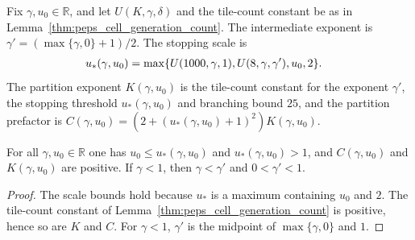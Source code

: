 \begin{definition}
    \label{def:peps_cell_partition_constants}
    \leanok
    Fix $\gamma,u_0\in\mathbb R$, and let $U(K,\gamma,\delta)$ and the
    tile-count constant be as in Lemma~\ref{thm:peps_cell_generation_count}.
    The intermediate exponent is $\gamma'=(\max\{\gamma,0\}+1)/2$. The stopping
    scale is
    \begin{align}
        u_*(\gamma,u_0) & =\max\{U(1000,\gamma,1),U(8,\gamma,\gamma'),u_0,2\}.
        \notag
    \end{align}
    The partition exponent $K(\gamma,u_0)$ is the tile-count constant for the
    exponent $\gamma'$, the stopping threshold $u_*(\gamma,u_0)$ and branching
    bound $25$, and the partition prefactor is
    $C(\gamma,u_0)=(2+(u_*(\gamma,u_0)+1)^2)K(\gamma,u_0)$.
\end{definition}

\begin{lemma}
    \label{thm:peps_cell_partition_constants_bounds}
    \leanok
    For all $\gamma,u_0\in\mathbb R$ one has $u_0\le u_*(\gamma,u_0)$ and
    $u_*(\gamma,u_0)>1$, and $C(\gamma,u_0)$ and $K(\gamma,u_0)$ are positive.
    If $\gamma<1$, then $\gamma<\gamma'$ and $0<\gamma'<1$.
\end{lemma}

\begin{proof}
    \leanok
    The scale bounds hold because $u_*$ is a maximum containing $u_0$ and $2$.
    The tile-count constant of Lemma~\ref{thm:peps_cell_generation_count} is
    positive, hence so are $K$ and $C$. For $\gamma<1$, $\gamma'$ is the midpoint
    of $\max\{\gamma,0\}$ and $1$.
\end{proof}

